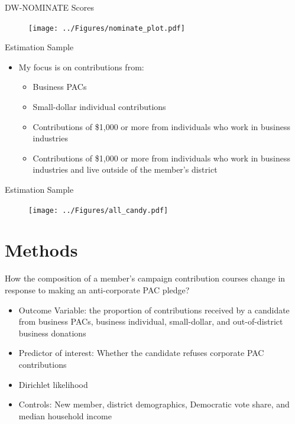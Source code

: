 \documentclass[12pt, aspectratio=169]{beamer}
\begin{document}
\begin{frame}{DW-NOMINATE Scores}
	\begin{figure}
		\centering
		\texttt{[image: ../Figures/nominate\_plot.pdf]}
	\end{figure}
\end{frame}

\begin{frame}{Estimation Sample}
	\begin{itemize}
		\item My focus is on contributions from: \pause
		\begin{itemize}
			\item Business PACs \pause
			\item Small-dollar individual contributions \pause
			\item Contributions of \$1,000 or more from individuals who work in business industries \pause
			\item Contributions of \$1,000 or more from individuals who work in business industries and live outside of the member's district \pause
		\end{itemize}
	\end{itemize}
\end{frame}

\begin{frame}{Estimation Sample}
	\begin{figure}
		\centering
		\texttt{[image: ../Figures/all\_candy.pdf]}
	\end{figure}
\end{frame}


\section{Methods}

\begin{frame}{How the composition of a member's campaign contribution courses change in response to making an anti-corporate PAC pledge?}
	\begin{itemize}
		\item Outcome Variable: the proportion of contributions received by a candidate from business PACs, business individual, small-dollar, and out-of-district business donations \pause
		\item Predictor of interest: Whether the candidate refuses corporate PAC contributions \pause
		\item Dirichlet likelihood \pause
		\item Controls: New member, district demographics, Democratic vote share, and median household income
	\end{itemize}
\end{frame}
\end{document}
